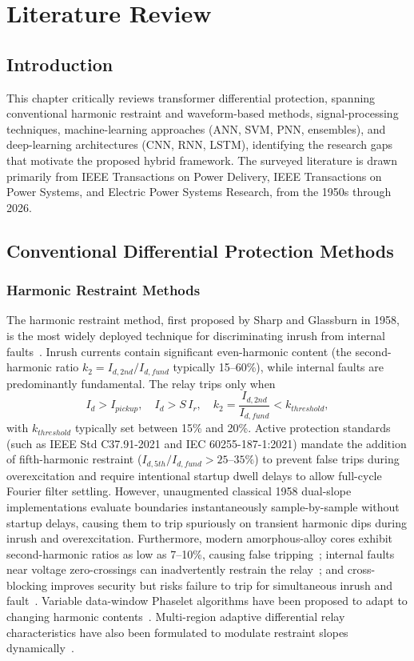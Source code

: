 \documentclass[12pt,a4paper,oneside]{report}
\begin{document}
\chapter{Literature Review}
\section{Introduction}
This chapter critically reviews transformer differential protection, spanning conventional harmonic restraint and waveform-based methods, signal-processing techniques, machine-learning approaches (ANN, SVM, PNN, ensembles), and deep-learning architectures (CNN, RNN, LSTM), identifying the research gaps that motivate the proposed hybrid framework. The surveyed literature is drawn primarily from IEEE Transactions on Power Delivery, IEEE Transactions on Power Systems, and Electric Power Systems Research, from the 1950s through 2026.

\section{Conventional Differential Protection Methods}
\subsection{Harmonic Restraint Methods}
The harmonic restraint method, first proposed by Sharp and Glassburn in 1958, is the most widely deployed technique for discriminating inrush from internal faults~\cite{ref7}. Inrush currents contain significant even-harmonic content (the second-harmonic ratio $k_2=I_{d,2nd}/I_{d,fund}$ typically 15--60\%), while internal faults are predominantly fundamental. The relay trips only when
\begin{equation}
I_d>I_{pickup},\quad I_d>S\,I_r,\quad k_2 = \frac{I_{d,2nd}}{I_{d,fund}} < k_{threshold},
\end{equation}
with $k_{threshold}$ typically set between 15\% and 20\%. Active protection standards (such as IEEE Std C37.91-2021 and IEC 60255-187-1:2021) mandate the addition of fifth-harmonic restraint ($I_{d,5th}/I_{d,fund} > 25\text{--}35\%$) to prevent false trips during overexcitation and require intentional startup dwell delays to allow full-cycle Fourier filter settling. However, unaugmented classical 1958 dual-slope implementations evaluate boundaries instantaneously sample-by-sample without startup delays, causing them to trip spuriously on transient harmonic dips during inrush and overexcitation. Furthermore, modern amorphous-alloy cores exhibit second-harmonic ratios as low as 7--10\%, causing false tripping~\cite{ref4}; internal faults near voltage zero-crossings can inadvertently restrain the relay~\cite{ref8}; and cross-blocking improves security but risks failure to trip for simultaneous inrush and fault~\cite{ref4}. Variable data-window Phaselet algorithms have been proposed to adapt to changing harmonic contents~\cite{ref40}. Multi-region adaptive differential relay characteristics have also been formulated to modulate restraint slopes dynamically~\cite{ref21,ref22}.
\end{document}
